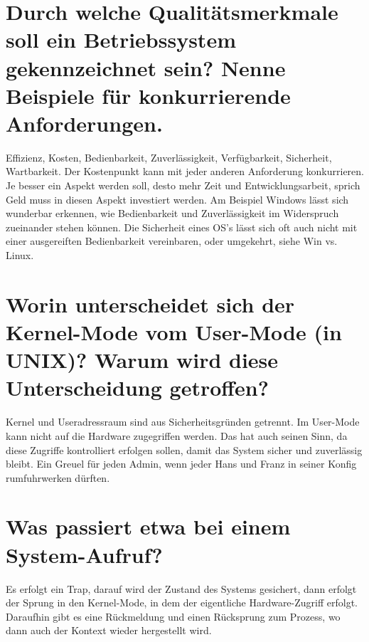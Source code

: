 \documentclass[12pt,a4paper,ngerman]{scrartcl}
\newcommand{\question}[1]{#1}
\newenvironment {answer}
                {}
                {}
\begin{document}
\section{\question{Durch welche Qualitätsmerkmale soll ein Betriebssystem gekennzeichnet sein? Nenne Beispiele für konkurrierende Anforderungen.}}
\begin{answer}
Effizienz, Kosten, Bedienbarkeit, Zuverlässigkeit, Verfügbarkeit, Sicherheit, Wartbarkeit.
Der Kostenpunkt kann mit jeder anderen Anforderung konkurrieren. Je besser ein Aspekt
werden soll, desto mehr Zeit und Entwicklungsarbeit, sprich Geld muss in diesen Aspekt
investiert werden. Am Beispiel Windows lässt sich wunderbar erkennen, wie Bedienbarkeit
und Zuverlässigkeit im Widerspruch zueinander stehen können. Die Sicherheit eines OS's
lässt sich oft auch nicht mit einer ausgereiften Bedienbarkeit vereinbaren, oder umgekehrt,
siehe Win vs. Linux.
\end{answer}

\section{\question{Worin unterscheidet sich der Kernel-Mode vom User-Mode (in UNIX)? Warum wird diese Unterscheidung getroffen?}}
\begin{answer}
Kernel und Useradressraum sind aus Sicherheitsgründen getrennt. Im User-Mode kann
nicht auf die Hardware zugegriffen werden. Das hat auch seinen Sinn, da diese Zugriffe
kontrolliert erfolgen sollen, damit das System sicher und zuverlässig bleibt. Ein Greuel für
jeden Admin, wenn jeder Hans und Franz in seiner Konfig rumfuhrwerken dürften.
\end{answer}

\section{\question{Was passiert etwa bei einem System-Aufruf?}}
\begin{answer}
Es erfolgt ein Trap, darauf wird der Zustand des Systems gesichert, dann erfolgt der Sprung
in den Kernel-Mode, in dem der eigentliche Hardware-Zugriff erfolgt. Daraufhin gibt es
eine Rückmeldung und einen Rücksprung zum Prozess, wo dann auch der Kontext wieder
hergestellt wird.
\end{answer}
\end{document}
